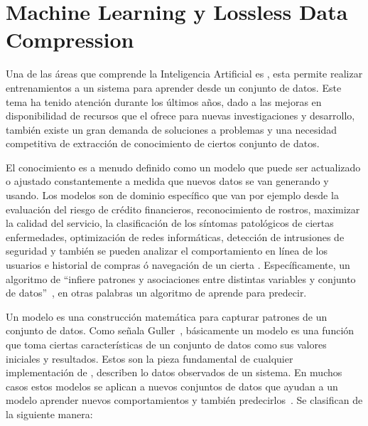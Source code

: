 \chapter[Machine Learning y Lossless Data Compression]{Machine Learning y Lossless Data Compression}\label{ch:Compresion-Machine-Learning}


Una de las áreas que comprende la Inteligencia Artificial es \machinelearning, esta permite realizar entrenamientos a un sistema para aprender desde un conjunto de datos. Este tema ha tenido atención durante los últimos años, dado a las mejoras en disponibilidad de recursos que el \cloudcomputing ofrece para nuevas investigaciones y desarrollo, también existe un gran demanda de soluciones a problemas y una necesidad competitiva de extracción de conocimiento de ciertos conjunto de datos.

El conocimiento es a menudo definido como un modelo que puede ser actualizado o ajustado constantemente a medida que nuevos datos se van generando y usando. Los modelos son  de dominio específico que van por ejemplo desde la evaluación del riesgo de crédito financieros, reconocimiento de rostros, maximizar la calidad del servicio, la clasificación de los síntomas patológicos de ciertas enfermedades, optimización de redes informáticas, detección de intrusiones de seguridad y también se pueden analizar el comportamiento en línea de los usuarios e historial de compras ó navegación  de un cierta \webs. Específicamente, un algoritmo de \machinelearning ``infiere patrones y asociaciones entre distintas variables y conjunto de datos''~\cite[capítulo 8]{guller2015big}, en otras palabras un algoritmo de \machinelearning aprende para predecir. 


Un modelo es una construcción matemática para capturar patrones de un conjunto de datos. Como señala Guller~\MLGuller, básicamente un modelo es una función que toma ciertas características de un conjunto de datos como sus valores iniciales y resultados.  Estos son la pieza fundamental de cualquier implementación de \machinelearning, describen lo datos observados de un sistema. En muchos casos estos modelos se aplican a nuevos conjuntos de datos  que ayudan a un modelo aprender nuevos comportamientos y también predecirlos~\MLPDASunila. Se clasifican de la siguiente manera:

